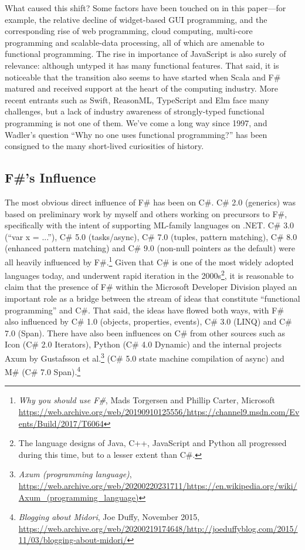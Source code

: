 \documentclass[acmsmall]{acmart}\settopmatter{}
\begin{document}
What caused this shift? Some factors have been touched on in this paper---for example, the relative decline of
widget-based GUI programming, and the corresponding rise of web programming, cloud computing, multi-core
programming and scalable-data processing, all of which are amenable to functional programming. The rise in importance
of JavaScript is also surely of relevance: although untyped it has many functional features. That said, it is noticeable
that the transition also seems to have started when Scala and F\# matured and received support at the heart of the
computing industry. More recent entrants such as Swift, ReasonML, TypeScript and Elm face many challenges,
but a lack of industry awareness of strongly-typed functional programming is not one of them. We’ve come a long
way since 1997, and Wadler’s question “Why no one uses functional programming?” has been consigned to the many short-lived curiosities of history.

\subsection*{F\#'s Influence}

The most obvious direct influence of F\# has been on C\#. C\# 2.0 (generics) was based on preliminary work
by myself and others working on precursors to F\#, specifically with the intent of supporting ML-family
languages on .NET. C\# 3.0 (“var x = ...”), C\# 5.0 (tasks/async), C\# 7.0 (tuples, pattern matching),
C\# 8.0 (enhanced pattern matching) and C\# 9.0 (non-null pointers as the default) were all heavily influenced by F\#.\footnote{\textit{Why you should use F\#}, Mads Torgersen and Phillip Carter, Microsoft \url{https://web.archive.org/web/20190910125556/https://channel9.msdn.com/Events/Build/2017/T6064}} Given that C\# is one of
the most widely adopted languages today, and underwent rapid iteration in the 2000s\footnote{The language designs of Java, C++, JavaScript and Python
all progressed during this time, but to a lesser extent than C\#.}, it is reasonable to
claim that the presence of F\# within the Microsoft Developer Division played an important role as a bridge
between the stream of ideas that constitute “functional programming” and C\#.   That said, the ideas have
flowed both ways, with F\# also influenced by C\# 1.0 (objects, properties, events), C\# 3.0 (LINQ) and C\# 7.0 (Span).
There have also been influences on C\# from other sources such as Icon (C\# 2.0 Iterators), Python (C\# 4.0 Dynamic) and
the internal projects Axum by Gustafsson et al.\footnote{\textit{Axum (programming language)}, \url{https://web.archive.org/web/20200220231711/https://en.wikipedia.org/wiki/Axum_(programming_language)}}  (C\# 5.0 state machine compilation of async) and M\#  (C\# 7.0 Span).\footnote{\textit{Blogging about Midori}, Joe Duffy, November 2015, \url{https://web.archive.org/web/20200219174648/http://joeduffyblog.com/2015/11/03/blogging-about-midori/}} 
\end{document}

